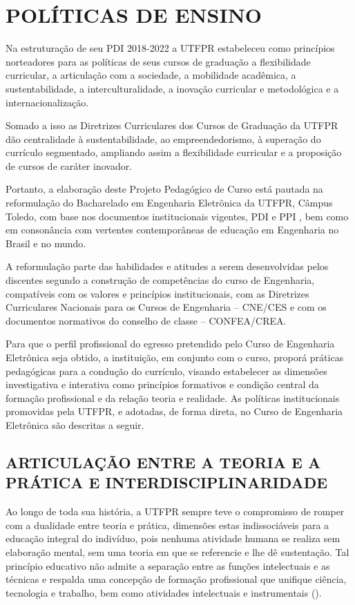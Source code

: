 \chapter{POLÍTICAS DE ENSINO}
\label{chap:politicas}

Na estruturação de seu PDI 2018-2022 \cite{pdiutfpr} a UTFPR estabeleceu como princípios norteadores para as políticas de seus cursos de graduação a flexibilidade curricular, a articulação com a sociedade, a mobilidade acadêmica, a sustentabilidade, a interculturalidade, a inovação curricular e metodológica e a internacionalização.

Somado a isso as Diretrizes Curriculares dos Cursos de Graduação da UTFPR \cite{cogep90} dão centralidade à sustentabilidade, ao empreendedorismo, à superação do currículo segmentado, ampliando assim a flexibilidade curricular e a proposição de cursos de caráter inovador.

Portanto, a elaboração deste Projeto Pedagógico de Curso está pautada na reformulação do Bacharelado em Engenharia Eletrônica da UTFPR, Câmpus Toledo, com base nos documentos institucionais vigentes, PDI \cite{pdiutfpr} e PPI \cite{ppiutfpr}, bem como em consonância com vertentes contemporâneas de educação em Engenharia no Brasil e no mundo.

A reformulação parte das habilidades e atitudes a serem desenvolvidas pelos discentes segundo a construção de competências do curso de Engenharia, compatíveis com os valores e princípios institucionais, com as Diretrizes Curriculares Nacionais para os Cursos de Engenharia – CNE/CES e com os documentos normativos do conselho de classe – CONFEA/CREA.

Para que o perfil profissional do egresso pretendido pelo Curso de Engenharia Eletrônica seja obtido, a instituição, em conjunto com o curso, proporá práticas pedagógicas para a condução do currículo, visando estabelecer as dimensões investigativa e interativa como princípios formativos e condição central da formação profissional e da relação teoria e realidade. As políticas institucionais promovidas pela UTFPR, e adotadas, de forma direta, no Curso de Engenharia Eletrônica são descritas a seguir.

\section{ARTICULAÇÃO ENTRE A TEORIA E A PRÁTICA E INTERDISCIPLINARIDADE}
\label{sec:artc}

Ao longo de toda sua história, a UTFPR sempre teve o compromisso de romper com a dualidade entre teoria e prática, dimensões estas indissociáveis para a educação integral do indivíduo, pois nenhuma atividade humana se realiza sem elaboração mental, sem uma teoria em que se referencie e lhe dê sustentação. Tal princípio educativo não admite a separação entre as funções intelectuais e as técnicas e respalda uma concepção de formação profissional que unifique ciência, tecnologia e trabalho, bem como atividades intelectuais e instrumentais ().

